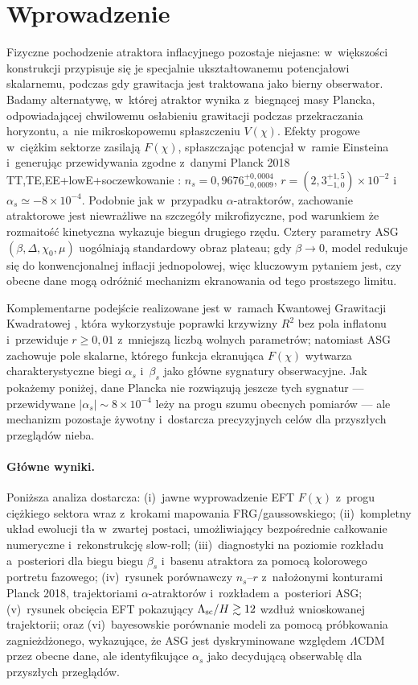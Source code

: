 \documentclass[11pt,a4paper]{article}
\begin{document}
\section{Wprowadzenie}
\label{sec:intro}
Fizyczne pochodzenie atraktora inflacyjnego pozostaje niejasne: w~większości konstrukcji przypisuje się je specjalnie ukształtowanemu potencjałowi skalarnemu, podczas gdy grawitacja jest traktowana jako bierny obserwator. Badamy alternatywę, w~której atraktor wynika z~biegnącej masy Plancka, odpowiadającej chwilowemu osłabieniu grawitacji podczas przekraczania horyzontu, a~nie mikroskopowemu spłaszczeniu $V(\chi)$. Efekty progowe w~ciężkim sektorze zasilają $F(\chi)$, spłaszczając potencjał w~ramie Einsteina i~generując przewidywania zgodne z~danymi Planck 2018 TT,TE,EE+lowE+soczewkowanie \cite{Planck2018}: $n_s=0{,}9676^{+0{,}0004}_{-0{,}0009}$, $r=(2{,}3^{+1{,}5}_{-1{,}0})\times10^{-2}$ i~$\alpha_s\simeq-8\times10^{-4}$. Podobnie jak w~przypadku $\alpha$-atraktorów, zachowanie atraktorowe jest niewrażliwe na szczegóły mikrofizyczne, pod warunkiem że rozmaitość kinetyczna wykazuje biegun drugiego rzędu. Cztery parametry ASG $(\beta,\Delta,\chi_0,\mu)$ uogólniają standardowy obraz plateau; gdy $\beta\to0$, model redukuje się do konwencjonalnej inflacji jednopolowej, więc kluczowym pytaniem jest, czy obecne dane mogą odróżnić mechanizm ekranowania od tego prostszego limitu.

Komplementarne podejście realizowane jest w~ramach Kwantowej Grawitacji Kwadratowej \cite{Liu2026}, która wykorzystuje poprawki krzywizny $R^2$ bez pola inflatonu i~przewiduje $r\ge0{,}01$ z~mniejszą liczbą wolnych parametrów; natomiast ASG zachowuje pole skalarne, którego funkcja ekranująca $F(\chi)$ wytwarza charakterystyczne biegi $\alpha_s$ i~$\beta_s$ jako główne sygnatury obserwacyjne. Jak pokażemy poniżej, dane Plancka nie rozwiązują jeszcze tych sygnatur --- przewidywane $|\alpha_s|\sim8\times10^{-4}$ leży na progu szumu obecnych pomiarów --- ale mechanizm pozostaje żywotny i~dostarcza precyzyjnych celów dla przyszłych przeglądów nieba.

\paragraph{Główne wyniki.} Poniższa analiza dostarcza: (i)~jawne wyprowadzenie EFT $F(\chi)$ z~progu ciężkiego sektora wraz z~krokami mapowania FRG/gaussowskiego; (ii)~kompletny układ ewolucji tła w~zwartej postaci, umożliwiający bezpośrednie całkowanie numeryczne i~rekonstrukcję slow-roll; (iii)~diagnostyki na poziomie rozkładu a~posteriori dla biegu biegu $\beta_s$ i~basenu atraktora za pomocą kolorowego portretu fazowego; (iv)~rysunek porównawczy $n_s$--$r$ z~nałożonymi konturami Planck 2018, trajektoriami $\alpha$-atraktorów i~rozkładem a~posteriori ASG; (v)~rysunek obcięcia EFT pokazujący $\Lambda_{\rm sc}/H \gtrsim 12$ wzdłuż wnioskowanej trajektorii; oraz (vi)~bayesowskie porównanie modeli za pomocą próbkowania zagnieżdżonego, wykazujące, że ASG jest dyskryminowane względem $\Lambda$CDM przez obecne dane, ale identyfikujące $\alpha_s$ jako decydującą obserwablę dla przyszłych przeglądów.
\end{document}
